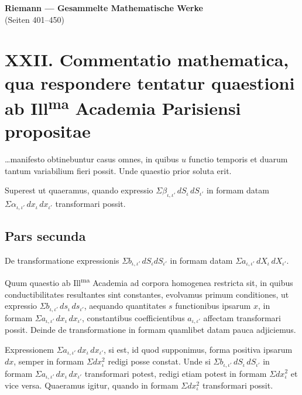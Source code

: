 \documentclass[12pt,a4paper]{article}
\begin{document}
\begin{center}
{\LARGE\bfseries Riemann --- Gesammelte Mathematische Werke}\\[0.5em]
{\Large (Seiten 401--450)}
\end{center}
\vspace{1em}

\section*{XXII. Commentatio mathematica, qua respondere tentatur
quaestioni ab Ill\textsuperscript{ma} Academia Parisiensi propositae}

\ldots manifesto obtinebuntur casus omnes, in quibus $u$ functio temporis et
 duarum tantum variabilium fieri possit. Unde quaestio prior soluta erit.

Superest ut quaeramus, quando expressio $\Sigma \beta_{\iota,\iota'}\, dS_{\iota}\, dS_{\iota'}$
in formam datam $\Sigma \alpha_{\iota,\iota'}\, dx_{\iota}\, dx_{\iota'}$ transformari possit.

\subsection*{Pars secunda}

De transformatione expressionis $\Sigma b_{\iota,\iota'}\, dS_{\iota} dS_{\iota'}$ in formam
 datam $\Sigma a_{\iota,\iota'}\, dX_{\iota}\, dX_{\iota'}$.

Quum quaestio ab Ill\textsuperscript{ma} Academia ad corpora homogenea restricta
 sit, in quibus conductibilitates resultantes sint constantes, evolvamus
primum conditiones, ut expressio $\Sigma b_{\iota,\iota'}\, ds_{\iota}\, ds_{\iota'}$, aequando
 quantitates $s$ functionibus ipsarum $x$, in formam
 $\Sigma a_{\iota,\iota'}\, dx_{\iota}\, dx_{\iota'}$, constantibus coefficientibus
 $a_{\iota,\iota'}$ affectam transformari possit. Deinde de transformatione
in formam quamlibet datam pauca adjiciemus.

Expressionem $\Sigma a_{\iota,\iota'}\, dx_{\iota}\, dx_{\iota'}$, si est, id quod supponimus, forma
positiva ipsarum $dx$, semper in formam $\Sigma dx_{\iota}^2$ redigi posse constat.
Unde si $\Sigma b_{\iota,\iota'}\, dS_{\iota}\, dS_{\iota'}$ in formam
$\Sigma a_{\iota,\iota'}\, dx_{\iota}\, dx_{\iota'}$ transformari potest, redigi etiam
 potest in formam $\Sigma dx_{\iota}^2$ et vice versa. Quaeramus igitur,
quando in formam $\Sigma dx_{\iota}^2$ transformari possit.
\end{document}
